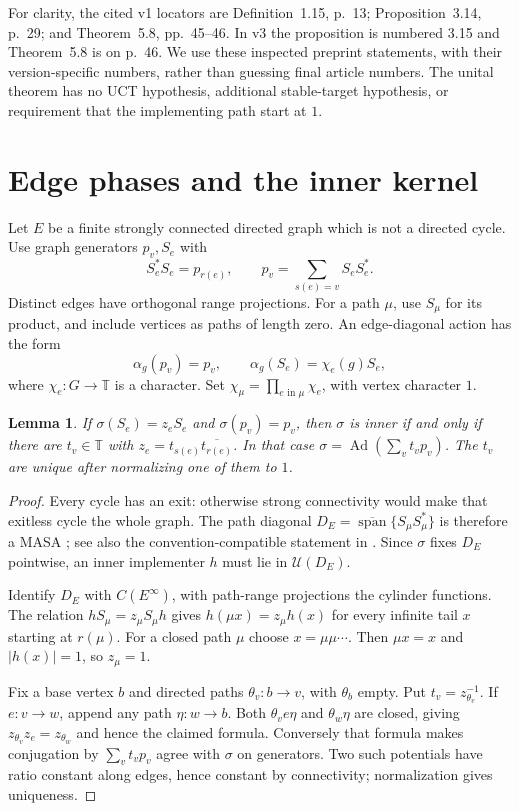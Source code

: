 \documentclass[11pt,a4paper]{article}
\newtheorem{lemma}[theorem]{Lemma}
\theoremstyle{definition}
\newcommand{\Ad}{\operatorname{Ad}}
\newcommand{\U}{\mathcal U}
\newcommand{\T}{\mathbb T}
\begin{document}
For clarity, the cited v1 locators are Definition~1.15, p.~13;
Proposition~3.14, p.~29; and Theorem~5.8, pp.~45--46. In v3 the proposition
is numbered 3.15 and Theorem~5.8 is on p.~46. We use these inspected
preprint statements, with their version-specific numbers, rather than
guessing final article numbers. The unital theorem has no UCT hypothesis,
additional stable-target hypothesis, or requirement that the implementing
path start at $1$.

\section{Edge phases and the inner kernel}

Let $E$ be a finite strongly connected directed graph which is not a
directed cycle. Use graph generators $p_v,S_e$ with
\[
 S_e^*S_e=p_{r(e)},\qquad
 p_v=\sum_{s(e)=v}S_eS_e^*.
\]
Distinct edges have orthogonal range projections. For a path $\mu$, use
$S_\mu$ for its product, and include vertices as paths of length zero.
An edge-diagonal action has the form
\[
 \alpha_g(p_v)=p_v,\qquad \alpha_g(S_e)=\chi_e(g)S_e,
\]
where $\chi_e:G\to\T$ is a character. Set
$\chi_\mu=\prod_{e\text{ in }\mu}\chi_e$, with vertex character $1$.

\begin{lemma}\label{lem:inner}
If $\sigma(S_e)=z_eS_e$ and $\sigma(p_v)=p_v$, then $\sigma$ is inner
if and only if there are $t_v\in\T$ with
$z_e=t_{s(e)}\overline{t_{r(e)}}$. In that case
$\sigma=\Ad(\sum_vt_vp_v)$. The $t_v$ are unique after normalizing one of
them to $1$.
\end{lemma}
\begin{proof}
Every cycle has an exit: otherwise strong connectivity would make that
exitless cycle the whole graph. The path diagonal
$D_E=\overline{\operatorname{span}}\{S_\mu S_\mu^*\}$ is therefore a
MASA \cite[Theorem~5.2]{HPP}; see also the convention-compatible statement
in \cite[\S2.1]{CHS}. Since $\sigma$ fixes $D_E$ pointwise, an inner
implementer $h$ must lie in $\U(D_E)$.

Identify $D_E$ with $C(E^\infty)$, with path-range projections the cylinder
functions. The relation $hS_\mu=z_\mu S_\mu h$ gives
$h(\mu x)=z_\mu h(x)$ for every infinite tail $x$ starting at $r(\mu)$.
For a closed path $\mu$ choose $x=\mu\mu\cdots$. Then $\mu x=x$ and
$|h(x)|=1$, so $z_\mu=1$.

Fix a base vertex $b$ and directed paths $\theta_v:b\to v$, with
$\theta_b$ empty. Put $t_v=z_{\theta_v}^{-1}$. If $e:v\to w$, append
any path $\eta:w\to b$. Both $\theta_v e\eta$ and $\theta_w\eta$ are
closed, giving $z_{\theta_v}z_e=z_{\theta_w}$ and hence the claimed
formula. Conversely that formula makes conjugation by $\sum_vt_vp_v$
agree with $\sigma$ on generators. Two such potentials have ratio
constant along edges, hence constant by connectivity; normalization gives
uniqueness.
\end{proof}
\end{document}
